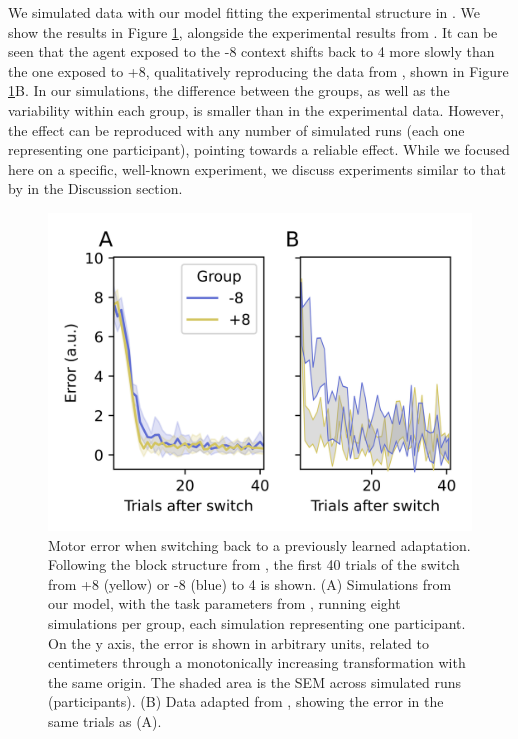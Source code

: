 \documentclass[a4paper,doc,floatsintext,natbib]{apa6}
\def \fref #1{Figure \ref{#1}}     %
\begin{document}
We simulated data with our model fitting the experimental structure in \cite{Davidson_Scaling_2004}. We show the results in \fref{fig:davidson-2004}, alongside the experimental results from \cite{Davidson_Scaling_2004}. It can be seen that the agent exposed to the -8 context shifts back to 4 more slowly than the one exposed to +8, qualitatively reproducing the data from \cite{Davidson_Scaling_2004}, shown in \fref{fig:davidson-2004}B. In our simulations, the difference between the groups, as well as the variability within each group, is smaller than in the experimental data. However, the effect can be reproduced with any number of simulated runs (each one representing one participant), pointing towards a reliable effect. While we focused here on a specific, well-known experiment, we discuss experiments similar to that by \cite{Davidson_Scaling_2004} in the Discussion section.

\begin{figure}
\centering
\includegraphics{./figures/figure_4.png}
\caption{Motor error when switching back to a previously learned adaptation. Following the block structure from \cite{Davidson_Scaling_2004}, the first 40 trials of the switch from +8 (yellow) or -8 (blue) to 4 is shown. (A) Simulations from our model, with the task parameters from \cite{Davidson_Scaling_2004}, running eight simulations per group, each simulation representing one participant. On the y axis, the error is shown in arbitrary units, related to centimeters through a monotonically increasing transformation with the same origin. The shaded area is the SEM across simulated runs (participants). (B) Data adapted from \cite{Davidson_Scaling_2004}, showing the error in the same trials as (A).}
\label{fig:davidson-2004}
\end{figure}
\end{document}
